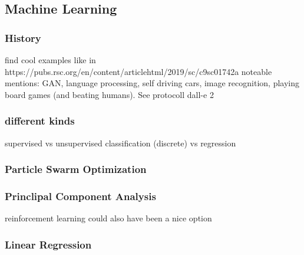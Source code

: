 

\subsection{Machine Learning}
\subsubsection{History}
find cool examples like in https://pubs.rsc.org/en/content/articlehtml/2019/sc/c9sc01742a
noteable mentions: GAN, language processing, self driving cars, image recognition, playing board games (and beating humans). 
See protocoll
dall-e 2 \cite{Marcus2022}
\subsubsection{different kinds} 
supervised vs unsupervised
classification (discrete) vs regression
\subsubsection{Particle Swarm Optimization}
\subsubsection{Princlipal Component Analysis}
reinforcement learning could also have been a nice option
\subsubsection{Linear Regression}
